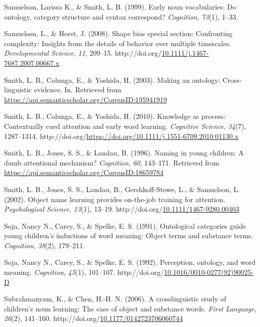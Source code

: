 \documentclass[10pt, letterpaper]{article}
\begin{document}
\begin{CSLReferences}{1}{0}
Samuelson, Larissa K., \& Smith, L. B. (1999). Early noun vocabularies:
Do ontology, category structure and syntax correspond? \emph{Cognition},
\emph{73}(1), 1--33.

Samuelson, L., \& Horst, J. (2008). Shape bias special section:
Confronting complexity: Insights from the details of behavior over
multiple timescales. \emph{Developmental Science}, \emph{11}, 209--15.
http://doi.org/\href{https://doi.org/10.1111/j.1467-7687.2007.00667.x}{10.1111/j.1467-7687.2007.00667.x}

Smith, L. B., Colunga, E., \& Yoshida, H. (2003). Making an ontology:
Cross-linguistic evidence. In. Retrieved from
\url{https://api.semanticscholar.org/CorpusID:195941919}

Smith, L. B., Colunga, E., \& Yoshida, H. (2010). Knowledge as process:
Contextually cued attention and early word learning. \emph{Cognitive
Science}, \emph{34}(7), 1287--1314.
http://doi.org/\url{https://doi.org/10.1111/j.1551-6709.2010.01130.x}

Smith, L. B., Jones, S. S., \& Landau, B. (1996). Naming in young
children: A dumb attentional mechanism? \emph{Cognition}, \emph{60},
143--171. Retrieved from
\url{https://api.semanticscholar.org/CorpusID:18659784}

Smith, L. B., Jones, S. S., Landau, B., Gershkoff-Stowe, L., \&
Samuelson, L. (2002). Object name learning provides on-the-job training
for attention. \emph{Psychological Science}, \emph{13}(1), 13--19.
http://doi.org/\href{https://doi.org/10.1111/1467-9280.00403}{10.1111/1467-9280.00403}

Soja, Nancy N., Carey, S., \& Spelke, E. S. (1991). Ontological
categories guide young children's inductions of word meaning: Object
terms and substance terms. \emph{Cognition}, \emph{38}(2), 179--211.

Soja, Nancy N., Carey, S., \& Spelke, E. S. (1992). Perception,
ontology, and word meaning. \emph{Cognition}, \emph{45}(1), 101--107.
http://doi.org/\href{https://doi.org/10.1016/0010-0277(92)90025-D}{10.1016/0010-0277(92)90025-D}

Subrahmanyam, K., \& Chen, H.-H. N. (2006). A crosslinguistic study of
children's noun learning: {The} case of object and substance words.
\emph{First Language}, \emph{26}(2), 141--160.
http://doi.org/\href{https://doi.org/10.1177/0142723706060744}{10.1177/0142723706060744}


\end{CSLReferences}
\end{document}
